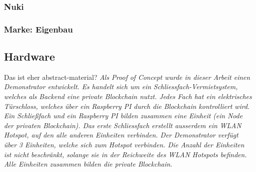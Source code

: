 \subsubsection{Nuki}

\subsubsection{Marke: Eigenbau}

\subsection{Hardware}
Das ist eher abstract-material? \emph{Als Proof of Concept wurde in dieser Arbeit einen Demonstrator entwickelt. Es handelt sich um ein Schliessfach-Vermietsystem, welches als Backend eine private Blockchain nutzt. Jedes Fach hat ein elektrisches Türschloss, welches über ein Raspberry PI durch die Blockchain kontrolliert wird. Ein Schließfach und ein Raspberry PI bilden zusammen eine Einheit (ein Node der privaten Blockchain). Das erste Schliessfach erstellt ausserdem ein WLAN Hotspot, auf den alle anderen Einheiten verbinden. Der Demonstrator verfügt über 3 Einheiten, welche sich zum Hotspot verbinden. Die Anzahl der Einheiten ist nicht beschränkt, solange sie in der Reichweite des WLAN Hotspots befinden. Alle Einheiten zusammen bilden die private Blockchain.}